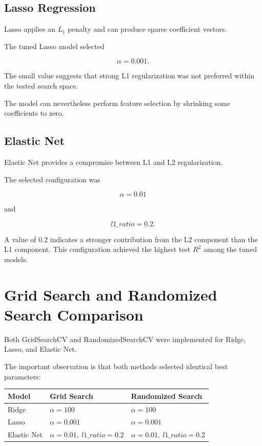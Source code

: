 \documentclass[12pt,a4paper]{article}
\begin{document}
\subsection{Lasso Regression}

Lasso applies an $L_1$ penalty and can produce sparse coefficient vectors.

The tuned Lasso model selected

\[
\alpha=0.001.
\]

The small value suggests that strong L1 regularization was not preferred
within the tested search space.

The model can nevertheless perform feature selection by shrinking some
coefficients to zero.

\subsection{Elastic Net}

Elastic Net provides a compromise between L1 and L2 regularization.

The selected configuration was

\[
\alpha=0.01
\]

and

\[
l1\_ratio=0.2.
\]

A value of $0.2$ indicates a stronger contribution from the L2 component
than the L1 component. This configuration achieved the highest test
$R^2$ among the tuned models.


\section{Grid Search and Randomized Search Comparison}

Both GridSearchCV and RandomizedSearchCV were implemented for Ridge,
Lasso, and Elastic Net.

The important observation is that both methods selected identical best
parameters:

\begin{longtable}{|p{3.5cm}|p{4cm}|p{4cm}|}
\hline
\textbf{Model} & \textbf{Grid Search} & \textbf{Randomized Search}
\\ \hline

Ridge &
$\alpha=100$ &
$\alpha=100$ \\ \hline

Lasso &
$\alpha=0.001$ &
$\alpha=0.001$ \\ \hline

Elastic Net &
$\alpha=0.01,\ l1\_ratio=0.2$ &
$\alpha=0.01,\ l1\_ratio=0.2$ \\ \hline

\end{longtable}
\end{document}
